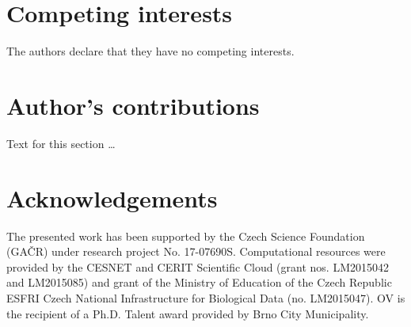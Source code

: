 \documentclass{bmcart}
\begin{document}
\begin{backmatter}

\section*{Competing interests}
  The authors declare that they have no competing interests.

\section*{Author's contributions}
    Text for this section \ldots

\section*{Acknowledgements}
The presented work has been supported by the Czech Science Foundation (GA{\v C}R) under research project No. 17-07690S.
Computational resources were provided by the CESNET and CERIT Scientific Cloud
(grant nos. LM2015042 and LM2015085) and grant of the Ministry of Education of
the Czech Republic ESFRI Czech National Infrastructure for Biological Data (no.
LM2015047). OV is the recipient of a Ph.D. Talent award provided by Brno City Municipality.





\end{backmatter}
\end{document}
